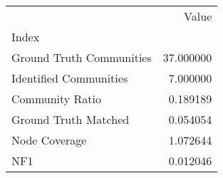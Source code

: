 \begin{tabular}{lr}
\toprule
{} &      Value \\
Index                    &            \\
\midrule
Ground Truth Communities &  37.000000 \\
Identified Communities   &   7.000000 \\
Community Ratio          &   0.189189 \\
Ground Truth Matched     &   0.054054 \\
Node Coverage            &   1.072644 \\
NF1                      &   0.012046 \\
\bottomrule
\end{tabular}
